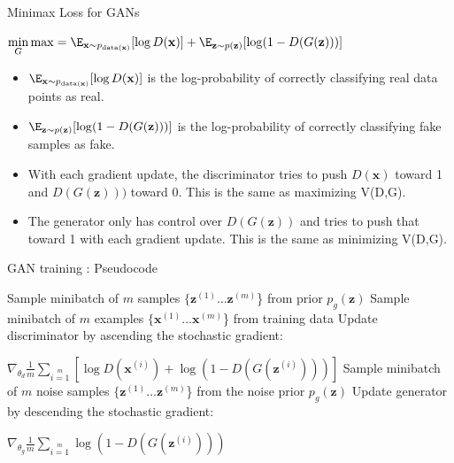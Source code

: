 \begin{frame} {Minimax Loss for GANs}
  \begin{tcolorbox}
    $\min \limits_G \max  %
    = \E_{\mathbf{x}\sim p_{\text{data}(\mathbf{x})}}[\log D(\mathbf{x})] + \E_{\mathbf{z}\sim p(\mathbf{z})}[\log (1 - D(G(\mathbf{z})))]$
  \end{tcolorbox}
  \begin{itemize}
    \item $\E_{\mathbf{x}\sim p_{\text{data}(\mathbf{x})}}[\log D(\mathbf{x})]$ is the log-probability of correctly classifying real data points as real. 
  \vspace{2mm}
    \item $\E_{\mathbf{z}\sim p(\mathbf{z})}[\log (1 - D(G(\mathbf{z})))]$ is the log-probability of correctly classifying fake samples as fake.
  \vspace{2mm}
    \item With each gradient update, the discriminator tries to push $D(\mathbf{x})$ toward 1 and $D(G(\mathbf{z})))$ toward 0. This is the same as maximizing V(D,G).
  \vspace{2mm}
    \item The generator  only has control over $D(G(\mathbf{z}))$ and tries to push that toward 1 with each gradient update. This is the same as minimizing V(D,G).
  \end{itemize}
\end{frame}

\begin{frame} {GAN training : Pseudocode}
  \begin{algorithm}[H]
  \footnotesize
    \caption{Minibatch stochastic gradient descent training of GANs. Amount of training iterations, amount of discriminator updates $k$ }
    \begin{algorithmic}[1]
          \State Sample minibatch of $m$ samples $\{\mathbf{z}^{(1)} \ldots \mathbf{z}^{(m)}$\} from  prior $p_g(\mathbf{z})$
          \State Sample minibatch of $m$ examples $\{\mathbf{x}^{(1)} \ldots \mathbf{x}^{(m)}$\} from  training data 
          \State Update discriminator by ascending the stochastic gradient: \item[]
  \hspace{2.5 cm}          $\nabla_{{\theta}_d} \frac {1}{m} \sum \limits_{i=1} \limits^{m} \left [ \log D(\mathbf{x}^{(i)}) + \log (1 - D(G(\mathbf{z}^{(i)}))) \right]$
        \EndFor
        \State Sample minibatch of $m$ noise samples $\{\mathbf{z}^{(1)} \ldots \mathbf{z}^{(m)}$\} from the noise prior $p_g(\mathbf{z})$
        \State Update generator by descending the stochastic gradient: \item[]
   \hspace{2.5 cm}       $\nabla_{{\theta}_g} \frac {1}{m} \sum \limits_{i=1} \limits^{m} \log (1 - D(G(\mathbf{z}^{(i)})))$
      \EndFor
    \end{algorithmic}
  \end{algorithm}
\end{frame}


